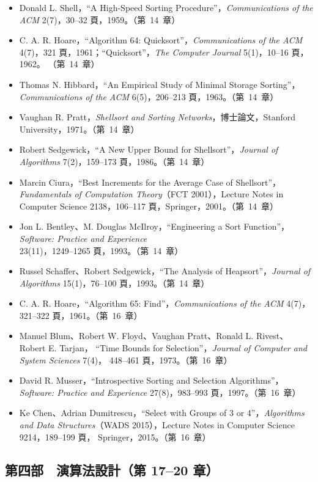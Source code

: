 \begin{itemize}
\item Donald L. Shell，``A High-Speed Sorting Procedure''，\textit{Communications of the
ACM} 2(7)，30--32 頁，1959。（第~14~章）
\item C. A. R. Hoare，``Algorithm 64: Quicksort''，\textit{Communications of the ACM}
4(7)，321 頁，1961；``Quicksort''，\textit{The Computer Journal} 5(1)，10--16 頁，1962。
（第~14~章）
\item Thomas N. Hibbard，``An Empirical Study of Minimal Storage Sorting''，
\textit{Communications of the ACM} 6(5)，206--213 頁，1963。（第~14~章）
\item Vaughan R. Pratt，\textit{Shellsort and Sorting Networks}，博士論文，Stanford
University，1971。（第~14~章）
\item Robert Sedgewick，``A New Upper Bound for Shellsort''，\textit{Journal of
Algorithms} 7(2)，159--173 頁，1986。（第~14~章）
\item Marcin Ciura，``Best Increments for the Average Case of Shellsort''，
\textit{Fundamentals of Computation Theory}（FCT 2001），Lecture Notes in Computer Science
2138，106--117 頁，Springer，2001。（第~14~章）
\item Jon L. Bentley、M. Douglas McIlroy，``Engineering a Sort Function''，
\textit{Software: Practice and Experience} 23(11)，1249--1265 頁，1993。（第~14~章）
\item Russel Schaffer、Robert Sedgewick，``The Analysis of Heapsort''，\textit{Journal
of Algorithms} 15(1)，76--100 頁，1993。（第~14~章）
\item C. A. R. Hoare，``Algorithm 65: Find''，\textit{Communications of the ACM} 4(7)，
321--322 頁，1961。（第~16~章）
\item Manuel Blum、Robert W. Floyd、Vaughan Pratt、Ronald L. Rivest、Robert E. Tarjan，
``Time Bounds for Selection''，\textit{Journal of Computer and System Sciences} 7(4)，
448--461 頁，1973。（第~16~章）
\item David R. Musser，``Introspective Sorting and Selection Algorithms''，
\textit{Software: Practice and Experience} 27(8)，983--993 頁，1997。（第~16~章）
\item Ke Chen、Adrian Dumitrescu，``Select with Groups of 3 or 4''，\textit{Algorithms
and Data Structures}（WADS 2015），Lecture Notes in Computer Science 9214，189--199 頁，
Springer，2015。（第~16~章）
\end{itemize}

\subsection*{第四部　演算法設計（第 17--20 章）}

